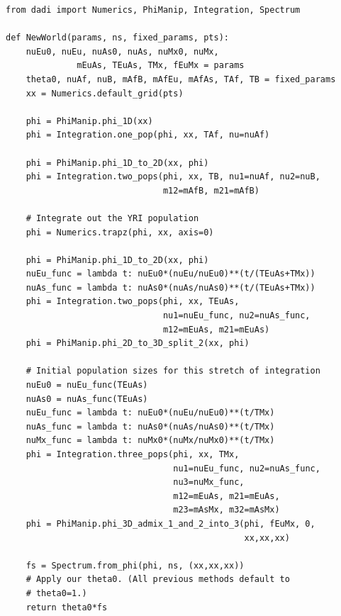 \documentclass[12pt]{article}
\makeatletter
\newcommand{\dadi}{dadi\xspace}
\newcommand{\py}[1]{\lstinline[language=Python, showstringspaces=False]@#1@}
\makeatother
\begin{document}
\begin{lstlisting}[caption={\textbf{Settlement-of-New-World model from Gutenkunst (2009):} Because \dadi is limited to 3 simultaneous populations, we need to integrate out the African population, using \py{Numerics.trapz}. This model also employs a fixed $\theta$, and ancillary parameters passed in using the third argument.}, float, label={lst:new_world},basicstyle=\tt\footnotesize]
from dadi import Numerics, PhiManip, Integration, Spectrum

def NewWorld(params, ns, fixed_params, pts):
    nuEu0, nuEu, nuAs0, nuAs, nuMx0, nuMx,
              mEuAs, TEuAs, TMx, fEuMx = params
    theta0, nuAf, nuB, mAfB, mAfEu, mAfAs, TAf, TB = fixed_params
    xx = Numerics.default_grid(pts)

    phi = PhiManip.phi_1D(xx)
    phi = Integration.one_pop(phi, xx, TAf, nu=nuAf)

    phi = PhiManip.phi_1D_to_2D(xx, phi)
    phi = Integration.two_pops(phi, xx, TB, nu1=nuAf, nu2=nuB,
                               m12=mAfB, m21=mAfB)

    # Integrate out the YRI population
    phi = Numerics.trapz(phi, xx, axis=0)

    phi = PhiManip.phi_1D_to_2D(xx, phi)
    nuEu_func = lambda t: nuEu0*(nuEu/nuEu0)**(t/(TEuAs+TMx))
    nuAs_func = lambda t: nuAs0*(nuAs/nuAs0)**(t/(TEuAs+TMx))
    phi = Integration.two_pops(phi, xx, TEuAs,
                               nu1=nuEu_func, nu2=nuAs_func,
                               m12=mEuAs, m21=mEuAs)
    phi = PhiManip.phi_2D_to_3D_split_2(xx, phi)

    # Initial population sizes for this stretch of integration
    nuEu0 = nuEu_func(TEuAs)
    nuAs0 = nuAs_func(TEuAs)
    nuEu_func = lambda t: nuEu0*(nuEu/nuEu0)**(t/TMx)
    nuAs_func = lambda t: nuAs0*(nuAs/nuAs0)**(t/TMx)
    nuMx_func = lambda t: nuMx0*(nuMx/nuMx0)**(t/TMx)
    phi = Integration.three_pops(phi, xx, TMx,
                                 nu1=nuEu_func, nu2=nuAs_func,
                                 nu3=nuMx_func,
                                 m12=mEuAs, m21=mEuAs,
                                 m23=mAsMx, m32=mAsMx)
    phi = PhiManip.phi_3D_admix_1_and_2_into_3(phi, fEuMx, 0,
                                               xx,xx,xx)

    fs = Spectrum.from_phi(phi, ns, (xx,xx,xx))
    # Apply our theta0. (All previous methods default to
    # theta0=1.)
    return theta0*fs
\end{lstlisting}
\end{document}
